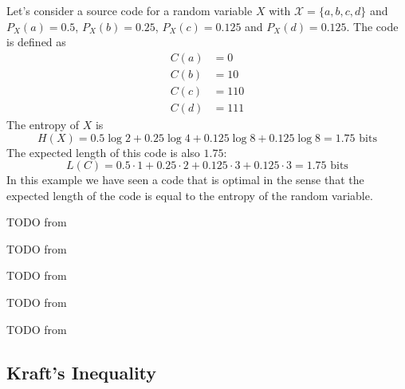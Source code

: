 \begin{example}
    Let's consider a source code for a random variable $X$ with $\mathcal{X} = \{a, b, c, d\}$ and $P_X(a) = 0.5$, $P_X(b) = 0.25$, $P_X(c) = 0.125$ and $P_X(d) = 0.125$. The code is defined as
    \begin{align*}
        C(a) &= 0 \\
        C(b) &= 10 \\
        C(c) &= 110 \\
        C(d) &= 111
    \end{align*}
    The entropy of $X$ is
    \begin{equation*}
        H(X) = 0.5\log 2 + 0.25\log 4 + 0.125\log 8 + 0.125\log 8 = 1.75 \text{ bits}
    \end{equation*}
    The expected length of this code is also $1.75$:
    \begin{equation*}
        L(C) = 0.5 \cdot 1 + 0.25 \cdot 2 + 0.125 \cdot 3 + 0.125 \cdot 3 = 1.75 \text{ bits}
    \end{equation*}
    In this example we have seen a code that is optimal in the sense that the expected length of the code is equal to the entropy of the random variable.
\end{example}

\begin{example}\label{ex:morse_code}
    TODO from \cite{ElementsofInformationTheory}
\end{example}

\begin{definition}\label{def:nonsingular_code}
    TODO from \cite{ElementsofInformationTheory}
\end{definition}

\begin{definition}\label{def:extension_code}
    TODO from \cite{ElementsofInformationTheory}
\end{definition}

\begin{definition}\label{def:unique_decodability}
    TODO from \cite{ElementsofInformationTheory}
\end{definition}

\begin{definition}\label{def:prefix_code}
    TODO from \cite{ElementsofInformationTheory}
\end{definition}

\subsection{Kraft's Inequality}

